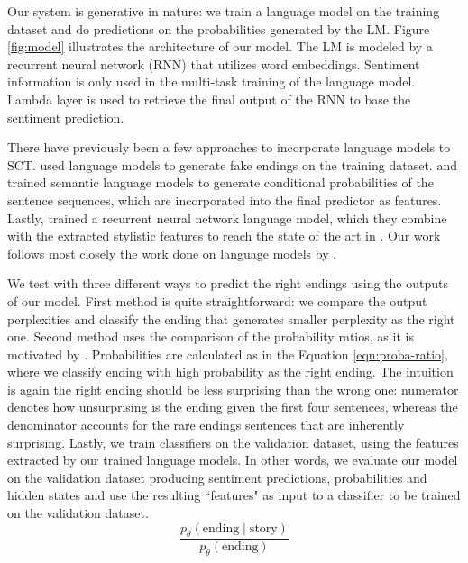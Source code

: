 \documentclass{article}
\begin{document}
\par Our system is generative in nature: we train a language model on the training dataset and do predictions on the probabilities generated by the LM. Figure \ref{fig:model} illustrates the architecture of our model. The LM is modeled by a recurrent neural network (RNN) that utilizes word embeddings. Sentiment information is only used in the multi-task training of the language model. Lambda layer is used to retrieve the final output of the RNN to base the sentiment prediction.

\par There have previously been a few approaches to incorporate language models to SCT. \citet{roemmele2017rnn} used language models to generate fake endings on the training dataset. \citet{chaturvedi2017story} and \citet{peng2017joint} trained semantic language models to generate conditional probabilities of the sentence sequences, which are incorporated into the final predictor as features. Lastly, \citet{schwartz2017effect} trained a recurrent neural network language model, which they combine with the extracted stylistic features to reach the state of the art in \citet{mostafazadeh2017lsdsem}. Our work follows most closely the work done on language models by \citet{schwartz2017effect}.

\par We test with three different ways to predict the right endings using the outputs of our model. First method is quite straightforward: we compare the output perplexities and classify the ending that generates smaller perplexity as the right one. Second method uses the comparison of the probability ratios, as it is motivated by \citet{schwartz2017effect}. Probabilities are calculated as in the Equation \ref{eqn:proba-ratio}, where we classify ending with high probability as the right ending. The intuition is again the right ending should be less surprising than the wrong one: numerator denotes how unsurprising is the ending given the first four sentences, whereas the denominator accounts for the rare endings sentences that are inherently surprising. Lastly, we train classifiers on the validation dataset, using the features extracted by our trained language models. In other words, we evaluate our model on the validation dataset \textemdash producing sentiment predictions, probabilities and hidden states \textemdash and use the resulting ``features" as input to a classifier to be trained on the validation dataset.
\begin{equation} \label{eqn:proba-ratio}
    \frac{ p_{\theta} (\text{ending} \mid \text{story}) }
    {p_{\theta} (\text{ending}) }
\end{equation}
\end{document}

